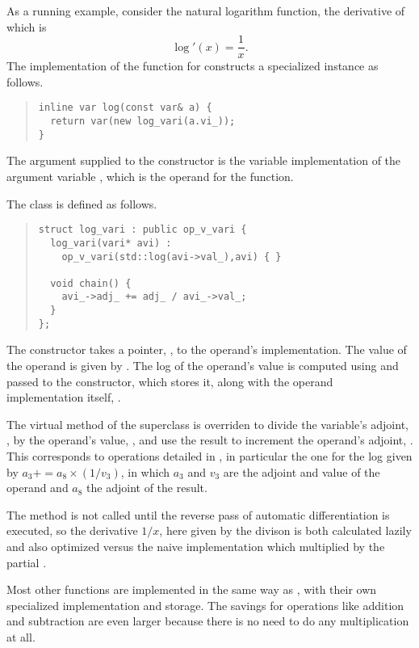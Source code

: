 \documentclass[10pt]{article}
\begin{document}
As a running example, consider the natural logarithm function, the
derivative of which is
%
\[
\log'(x) = \frac{1}{x}.
\]
%
The implementation of the  function for 
constructs a specialized  instance as follows.
%
\begin{quote}
\begin{Verbatim}
inline var log(const var& a) {
  return var(new log_vari(a.vi_));
}
\end{Verbatim}
\end{quote}
%
The argument  supplied to the constructor is the variable
implementation of the argument variable , which is the operand
for the  function.

The class  is defined as follows.
%
\begin{quote}
\begin{Verbatim}
struct log_vari : public op_v_vari {
  log_vari(vari* avi) :
    op_v_vari(std::log(avi->val_),avi) { }

  void chain() {
    avi_->adj_ += adj_ / avi_->val_;
  }
};
\end{Verbatim}
\end{quote}
%
The constructor takes a pointer, , to the operand's
implementation.  The value of the operand is given by
.  The log of the operand's value is computed using
 and passed to the  constructor,
which stores it, along with the operand implementation itself,
.  

The virtual  method of the superclass 
is overriden to divide the variable's adjoint, , by the
operand's value, , and use the result to increment
the operand's adjoint, .  This corresponds to
\code{+=} operations detailed in , in
particular the one for the log given by $a_3 += a_8 \times (1 / v_3)$,
in which $a_3$ and $v_3$ are the adjoint and value of the operand and
$a_8$ the adjoint of the result.

The  method is not called until the reverse pass of
automatic differentiation is executed, so the derivative $1/x$, here
given by the divison  is both calculated lazily
and also optimized versus the naive implementation which multiplied
 by the partial .  

Most other functions are implemented in the same way as ,
with their own specialized  implementation and storage.
The savings for operations like addition and subtraction are even
larger because there is no need to do any multiplication at all.
\end{document}
